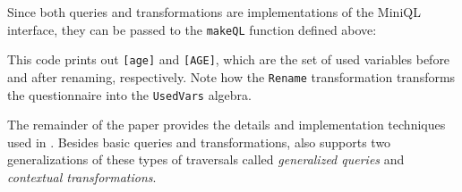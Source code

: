 Since both queries and transformations are implementations of the MiniQL interface, they can be passed to the \lstinline{makeQL} function defined above:

This code prints out  \lstinline{[age]} and \lstinline{[AGE]}, which
are the set of used variables before and after renaming, respectively.
Note how the \lstinline{Rename} transformation transforms the questionnaire into the \lstinline{UsedVars} algebra.

The remainder of the paper provides the details and implementation
techniques used in \Name. Besides basic queries and transformations,
\name also supports two generalizations of these types of traversals
called \emph{generalized queries} and \emph{contextual transformations}.

